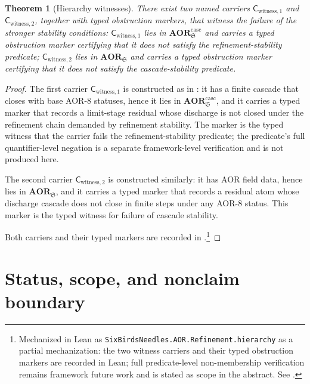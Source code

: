 \documentclass[11pt]{article}
\newcommand{\AOR}{\mathbf{AOR}}
\newcommand{\CascadeStableAOR}{\mathbf{AOR}^{\mathrm{casc}}}
\newtheorem{theorem}{Theorem}[section]
\theoremstyle{definition}
\begin{document}
\begin{theorem}[Hierarchy witnesses]\label{thm:aor:hierarchy}
There exist two named carriers
\(\mathsf C_{\mathrm{witness},1}\) and
\(\mathsf C_{\mathrm{witness},2}\), together with typed obstruction
markers, that witness the failure of the stronger stability conditions:
\(\mathsf C_{\mathrm{witness},1}\) lies in
\(\CascadeStableAOR_{\mathfrak S}\) and carries a typed obstruction marker
certifying that it does not satisfy the refinement-stability predicate;
\(\mathsf C_{\mathrm{witness},2}\) lies in \(\AOR_{\mathfrak S}\) and
carries a typed obstruction marker certifying that it does not satisfy the
cascade-stability predicate.
\end{theorem}

\begin{proof}
The first carrier \(\mathsf C_{\mathrm{witness},1}\) is constructed as in
: it has a finite cascade that closes
with base AOR-8 statuses, hence it lies in
\(\CascadeStableAOR_{\mathfrak S}\), and it carries a typed
 marker that records a limit-stage residual
whose discharge is not closed under the refinement chain demanded by
refinement stability.  The marker is the typed witness that the carrier
fails the refinement-stability predicate; the predicate's full
quantifier-level negation is a separate framework-level verification and is
not produced here.

The second carrier \(\mathsf C_{\mathrm{witness},2}\) is constructed
similarly: it has AOR field data, hence lies in \(\AOR_{\mathfrak S}\), and
it carries a typed  marker that records a
residual atom whose discharge cascade does not close in finite steps under
any AOR-8 status.  This marker is the typed witness for failure of cascade
stability.

Both carriers and their typed markers are recorded in
.\footnote{Mechanized in Lean as
\texttt{SixBirdsNeedles.AOR.Refinement.hierarchy} as a partial mechanization:
the two witness carriers and their typed obstruction markers are recorded in
Lean; full predicate-level non-membership verification remains framework
future work and is stated as scope in the abstract. See
.}
\end{proof}
 

\section{Status, scope, and nonclaim boundary}\label{sec:aor-discussion}
\end{document}
